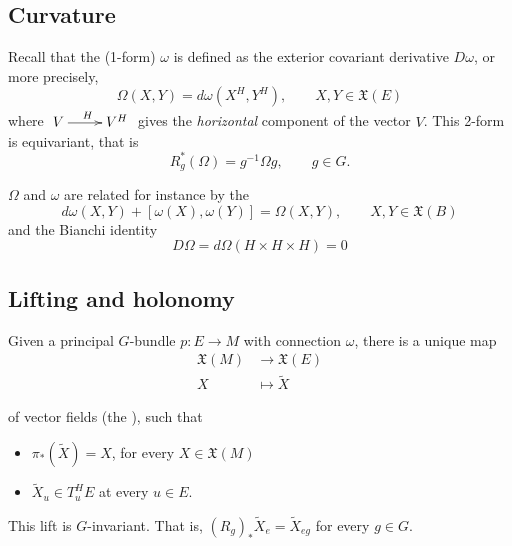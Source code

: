 
\subsection{Curvature} Recall that the  (1-form) $\omega$ is defined as the exterior covariant derivative $D\omega$, or more precisely,\[
\Omega(X,Y)=d\omega(X^H,Y^H)   , \qquad X,Y\in \mathfrak{X}(E)       \]
where $\xymatrix{V\ar[r]^H & V^H}$ gives the \emph{horizontal} component of the vector $V$.
This 2-form is equivariant, that is \[ R_g^* (\Omega)=g^{-1}\Omega g, \qquad g\in G. \]

$\Omega$ and $\omega$ are related for instance by the  \[
                                                                          d\omega(X,Y)+[\omega(X),\omega(Y)]=\Omega(X,Y), \qquad X,Y\in \mathfrak{X}(B) 
                            \]
and the Bianchi identity \[
                          D\Omega=d\Omega (H\times H\times H)=0
                         \]




\subsection{Lifting and holonomy}

Given a principal $G$-bundle $p:E\rightarrow M$ with connection $\omega$, there is a unique map \begin{align*}
\mathfrak{X}(M)&\rightarrow \mathfrak{X}(E)\\
X &\mapsto \widetilde{X} 
\end{align*}

of vector fields (the ), such that \begin{itemize}
                                                             \item $\pi_*(\widetilde{X})=X$, for every $X\in\mathfrak{X}(M)$
							     \item $\widetilde{X}_u\in T^H_u E$ at every $u\in E$.
                                                            \end{itemize}
This lift is $G$-invariant. That is, $(R_g)_*\widetilde{X}_e=\widetilde{X}_{eg}$ for every $g\in G$.


